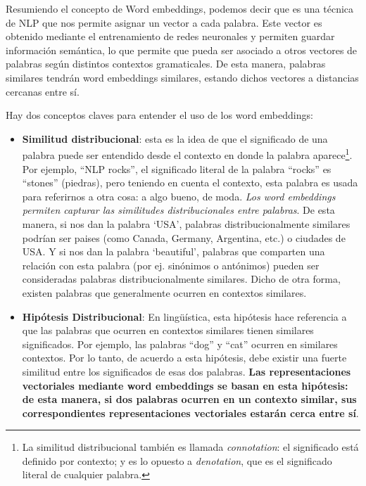 \documentclass[12pt,a4paper]{article}
\begin{document}
\begin{sloppypar}
Resumiendo el concepto de Word embeddings, podemos decir que es una técnica de NLP que nos permite asignar un vector a cada palabra. Este vector es obtenido mediante el entrenamiento de redes neuronales y permiten guardar información semántica, lo que permite que pueda ser asociado a otros vectores de palabras según distintos contextos gramaticales. De esta manera, palabras similares tendrán word embeddings similares, estando dichos vectores a distancias cercanas entre sí.

Hay dos conceptos claves para entender el uso de los word embeddings:
\begin{itemize}
\item \textbf{Similitud distribucional}\cite{NLP_26}: esta es la idea de que el significado de una palabra puede ser entendido desde el contexto en donde la palabra aparece\footnote{La similitud distribucional también es llamada \textit{connotation}: el significado está definido por contexto; y es lo opuesto a \textit{denotation}, que es el significado literal de cualquier palabra.}. Por ejemplo, “NLP rocks”, el significado literal de la palabra “rocks” es “stones” (piedras), pero teniendo en cuenta el contexto, esta palabra es usada para referirnos a otra cosa: a algo bueno, de moda.  \textit{Los word embeddings permiten capturar las similitudes distribucionales entre palabras}.  De esta manera, si nos dan la palabra ‘USA’, palabras distribucionalmente similares podrían ser paises (como Canada, Germany, Argentina, etc.) o ciudades de USA. Y si nos dan la palabra ‘beautiful’, palabras que comparten una relación con esta palabra (por ej. sinónimos o antónimos) pueden ser consideradas palabras distribucionalmente similares. Dicho de otra forma, existen palabras que generalmente ocurren en contextos similares.
\item \textbf{Hipótesis Distribucional}\cite{NLP_26}: En lingüística, esta hipótesis hace referencia a que las palabras que ocurren en contextos similares tienen similares significados. Por ejemplo, las palabras “dog” y “cat” ocurren en similares contextos. Por lo tanto, de acuerdo a esta hipótesis, debe existir una fuerte similitud entre los significados de esas dos palabras. \textbf{Las representaciones vectoriales mediante word embeddings se basan en esta hipótesis: de esta manera, si dos palabras ocurren en un contexto similar, sus correspondientes representaciones vectoriales estarán cerca entre sí}.  

\end{itemize}


\end{sloppypar}
\end{document}
